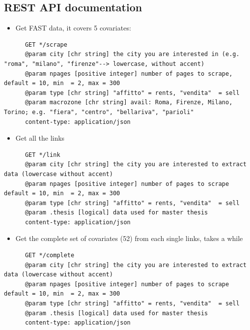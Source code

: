 \documentclass[
  12pt,
  a4paper,
  oneside]{book}
\providecommand{\tightlist}{%
  \setlength{\itemsep}{0pt}\setlength{\parskip}{0pt}}
\theoremstyle{definition}
\theoremstyle{definition}
\theoremstyle{definition}
\theoremstyle{remark}
\begin{document}
\hypertarget{APIdocs}{%
\subsection{REST API documentation}\label{APIdocs}}

\begin{itemize}
\tightlist
\item
  Get FAST data, it covers 5 covariates:
\end{itemize}

\begin{verbatim}
      GET */scrape
      @param city [chr string] the city you are interested in (e.g. "roma", "milano", "firenze"--> lowercase, without accent)
      @param npages [positive integer] number of pages to scrape, default = 10, min  = 2, max = 300
      @param type [chr string] "affitto" = rents, "vendita"  = sell 
      @param macrozone [chr string] avail: Roma, Firenze, Milano, Torino; e.g. "fiera", "centro", "bellariva", "parioli" 
      content-type: application/json 
\end{verbatim}

\begin{itemize}
\tightlist
\item
  Get all the links
\end{itemize}

\begin{verbatim}
      GET */link
      @param city [chr string] the city you are interested to extract data (lowercase without accent)
      @param npages [positive integer] number of pages to scrape default = 10, min  = 2, max = 300
      @param type [chr string] "affitto" = rents, "vendita"  = sell 
      @param .thesis [logical] data used for master thesis
      content-type: application/json 
\end{verbatim}

\begin{itemize}
\tightlist
\item
  Get the complete set of covariates (52) from each single links, takes a while
\end{itemize}

\begin{verbatim}
      GET */complete
      @param city [chr string] the city you are interested to extract data (lowercase without accent)
      @param npages [positive integer] number of pages to scrape default = 10, min  = 2, max = 300
      @param type [chr string] "affitto" = rents, "vendita"  = sell 
      @param .thesis [logical] data used for master thesis
      content-type: application/json
\end{verbatim}
\end{document}
